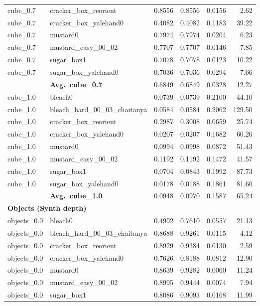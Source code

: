 \begin{longtable}{llrrrr}
  cube_0.7 & cracker\_box\_reorient & 0.8556 & 0.8556 & 0.0156 & 2.62 \\
  cube_0.7 & cracker\_box\_yalehand0 & 0.4082 & 0.4082 & 0.1183 & 39.22 \\
  cube_0.7 & mustard0 & 0.7974 & 0.7974 & 0.0204 & 6.23 \\
  cube_0.7 & mustard\_easy\_00\_02 & 0.7707 & 0.7707 & 0.0146 & 7.85 \\
  cube_0.7 & sugar\_box1 & 0.7078 & 0.7078 & 0.0123 & 10.22 \\
  cube_0.7 & sugar\_box\_yalehand0 & 0.7036 & 0.7036 & 0.0294 & 7.66 \\
  \cmidrule{2-6}
  & \textbf{Avg.~cube_0.7} & 0.6849 & 0.6849 & 0.0328 & 12.27 \\
  \midrule
  cube_1.0 & bleach0 & 0.0739 & 0.0739 & 0.2100 & 44.10 \\
  cube_1.0 & bleach\_hard\_00\_03\_chaitanya & 0.0584 & 0.0584 & 0.2062 & 129.50 \\
  cube_1.0 & cracker\_box\_reorient & 0.2987 & 0.3008 & 0.0659 & 25.74 \\
  cube_1.0 & cracker\_box\_yalehand0 & 0.0207 & 0.0207 & 0.1682 & 60.26 \\
  cube_1.0 & mustard0 & 0.0994 & 0.0998 & 0.0872 & 51.43 \\
  cube_1.0 & mustard\_easy\_00\_02 & 0.1192 & 0.1192 & 0.1472 & 41.57 \\
  cube_1.0 & sugar\_box1 & 0.0704 & 0.0843 & 0.1992 & 87.73 \\
  cube_1.0 & sugar\_box\_yalehand0 & 0.0178 & 0.0188 & 0.1861 & 81.60 \\
  \cmidrule{2-6}
  & \textbf{Avg.~cube_1.0} & 0.0948 & 0.0970 & 0.1587 & 65.24 \\
  \midrule
\multicolumn{6}{l}{\textbf{Objects (Synth depth)}} \\
\midrule
  objects_0.0 & bleach0 & 0.4992 & 0.7610 & 0.0557 & 21.13 \\
  objects_0.0 & bleach\_hard\_00\_03\_chaitanya & 0.8688 & 0.9261 & 0.0115 & 4.12 \\
  objects_0.0 & cracker\_box\_reorient & 0.8929 & 0.9384 & 0.0130 & 2.59 \\
  objects_0.0 & cracker\_box\_yalehand0 & 0.7626 & 0.8188 & 0.0812 & 12.90 \\
  objects_0.0 & mustard0 & 0.8639 & 0.9282 & 0.0060 & 11.24 \\
  objects_0.0 & mustard\_easy\_00\_02 & 0.8995 & 0.9444 & 0.0074 & 7.94 \\
  objects_0.0 & sugar\_box1 & 0.8086 & 0.9093 & 0.0168 & 11.99 \\

\end{longtable}
